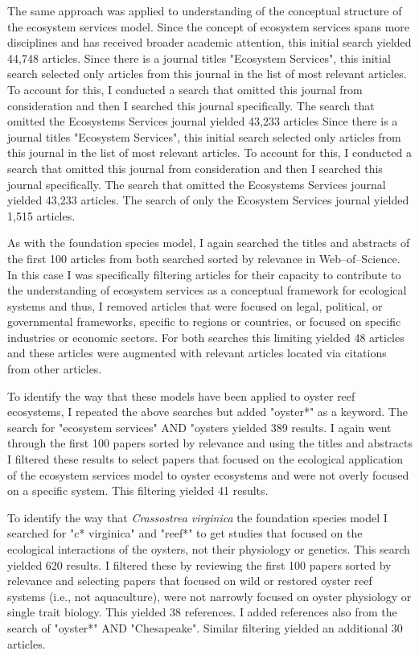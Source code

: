 \documentclass{article}
\begin{document}
The same approach was applied to understanding of the conceptual structure of the ecosystem services model. Since the concept of ecosystem services spans more disciplines and has received broader academic attention, this initial search yielded 44,748 articles. Since there is a journal titles "Ecosystem Services", this initial search selected only articles from this journal in the list of most relevant articles. To account for this, I conducted a search that omitted this journal from consideration and then I searched this journal specifically. The search that omitted the Ecosystems Services journal yielded 43,233 articles Since there is a journal titles "Ecosystem Services", this initial search selected only articles from this journal in the list of most relevant articles. To account for this, I conducted a search that omitted this journal from consideration and then I searched this journal specifically. The search that omitted the Ecosystems Services journal yielded 43,233 articles. The search of only the Ecosystem Services journal yielded 1,515 articles.  

As with the foundation species model, I again searched the titles and abstracts of the first 100 articles from both searched sorted by relevance in Web--of--Science. In this case I was specifically filtering articles for their capacity to contribute to the understanding of ecosystem services as a conceptual framework for ecological systems and thus, I removed articles that were focused on legal, political, or governmental frameworks, specific to regions or countries, or focused on specific industries or economic sectors. For both searches this limiting yielded 48 articles and these articles were augmented with relevant articles located via citations from other articles.

To identify the way that these models have been applied to oyster reef ecosystems, I repeated the above searches but added "oyster*" as a keyword. The search for "ecosystem services" AND "oysters yielded 389 results. I again went through the first 100 papers sorted by relevance and using the titles and abstracts I filtered these results to select papers that focused on the ecological application of the ecosystem services model to oyster ecosystems and were not overly focused on a specific system. This filtering yielded 41 results.

To identify the way that \emph{Crassostrea virginica} the foundation species model I searched for "c* virginica" and "reef*" to get studies that focused on the ecological interactions of the oysters, not their physiology or genetics. This search yielded 620 results. I filtered these by reviewing the first 100 papers sorted by relevance and selecting papers that focused on wild or restored oyster reef systems (i.e., not aquaculture), were not narrowly focused on oyster physiology or single trait biology. This yielded 38 references. I added references also from the search of "oyster*" AND "Chesapeake". Similar filtering yielded an additional 30 articles.
\end{document}
